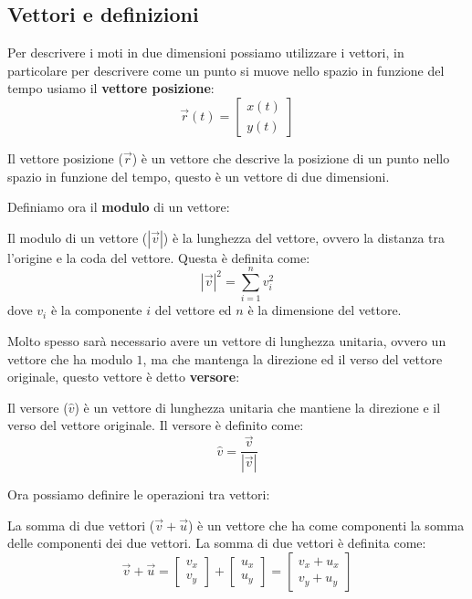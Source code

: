     \subsection{Vettori e definizioni}
        Per descrivere i moti in due dimensioni possiamo utilizzare i vettori, in particolare per descrivere come un punto si muove nello spazio in funzione del tempo usiamo il \textbf{vettore posizione}:
        $$
            \vec{r}(t) = \begin{bmatrix} x(t)\\ y(t) \end{bmatrix}
        $$
        \begin{definition}
            Il vettore posizione ($\vec{r}$) è un vettore che descrive la posizione di un punto nello spazio in funzione del tempo, questo è un vettore di due dimensioni.
        \end{definition}
        Definiamo ora il \textbf{modulo} di un vettore:
        \begin{definition}
            Il modulo di un vettore ($\left|\vec{v}\right|$) è la lunghezza del vettore, ovvero la distanza tra l'origine e la coda del vettore. Questa è definita come:
            $$
                \left|\vec{v}\right|^2 = \sum_{i=1}^n v_i^2
            $$
            dove $v_i$ è la componente $i$ del vettore ed $n$ è la dimensione del vettore.
        \end{definition}
        Molto spesso sarà necessario avere un vettore di lunghezza unitaria, ovvero un vettore che ha modulo $1$, ma che mantenga la direzione ed il verso del vettore originale, questo vettore è detto \textbf{versore}:
        \begin{definition}[Versore]
            Il versore ($\hat{v}$) è un vettore di lunghezza unitaria che mantiene la direzione e il verso del vettore originale. Il versore è definito come:
            $$
                \hat{v} = \frac{\vec{v}}{\left|\vec{v}\right|}
            $$
        \end{definition}
        Ora possiamo definire le operazioni tra vettori:
        \begin{definition}
            La somma di due vettori ($\vec{v}+\vec{u}$) è un vettore che ha come componenti la somma delle componenti dei due vettori. La somma di due vettori è definita come:
            $$
                \vec{v}+\vec{u} = \begin{bmatrix} v_x\\ v_y \end{bmatrix} + \begin{bmatrix} u_x\\ u_y \end{bmatrix} = \begin{bmatrix} v_x+u_x\\ v_y+u_y \end{bmatrix}
            $$
        \end{definition}
